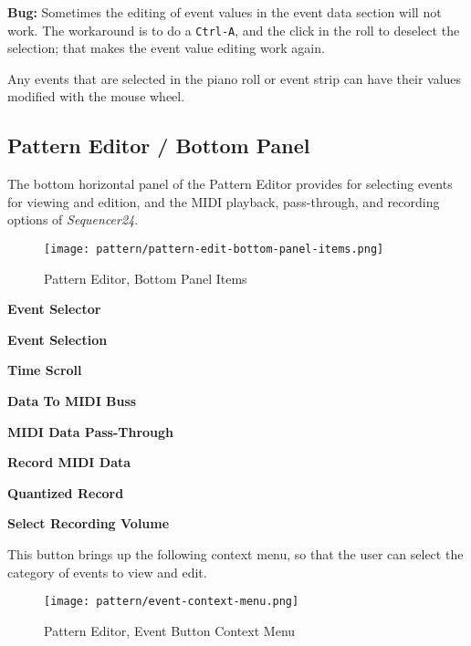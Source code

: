    \textbf{Bug:}
   Sometimes the editing of event values in the event data section will not work.
   The workaround is to do a \texttt{Ctrl-A}, and the click in the roll
   to deselect the selection; that makes the event value editing work again.
   
   Any events that are selected in the piano roll or event strip can have
   their values modified with the mouse wheel.

\subsection{Pattern Editor / Bottom Panel}
\label{subsec:seq24_pattern_editor_bottom}

   The bottom horizontal panel of the Pattern Editor provides for
   selecting events for viewing and edition, and the MIDI playback,
   pass-through, and recording options of \textsl{Sequencer24}.

\begin{figure}[H]
   \centering 
   \texttt{[image: pattern/pattern-edit-bottom-panel-items.png]}
   \caption{Pattern Editor, Bottom Panel Items}
   \label{fig:pattern_editor_bottom_panel_items}
\end{figure}

   \begin{enumber}
      \item \textbf{Event Selector}
      \item \textbf{Event Selection}
      \item \textbf{Time Scroll}
      \item \textbf{Data To MIDI Buss}
      \item \textbf{MIDI Data Pass-Through}
      \item \textbf{Record MIDI Data}
      \item \textbf{Quantized Record}
      \item \textbf{Select Recording Volume}
   \end{enumber}

   \setcounter{ItemCounter}{0}      %

   This button brings up the following context menu, so that the user can
   select the category of events to view and edit.

\begin{figure}[H]
   \centering 
   \texttt{[image: pattern/event-context-menu.png]}
   \caption{Pattern Editor, Event Button Context Menu}
   \label{fig:pattern_editor_bottom_event_context_menu}
\end{figure}

